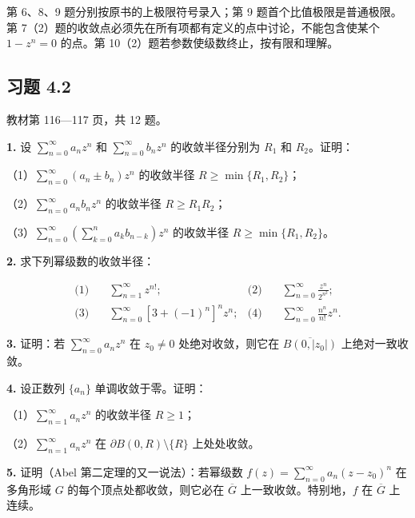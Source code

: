 \documentclass[11pt,a4paper]{article}
\begin{document}
第 6、8、9 题分别按原书的上极限符号录入；第 9
题首个比值极限是普通极限。第
7（2）题的收敛点必须先在所有项都有定义的点中讨论，不能包含使某个
\(1-z^n=0\) 的点。第 10（2）题若参数使级数终止，按有限和理解。

\subsection{习题 4.2}\label{ch04-practice-heading-2}

教材第 116---117 页，共 12 题。

\par{}
\noindent\textbf{1.} 设 \(\sum_{n=0}^{\infty}a_nz^n\) 和
\(\sum_{n=0}^{\infty}b_nz^n\) 的收敛半径分别为 \(R_1\) 和
\(R_2\)。证明：

（1）\(\sum_{n=0}^{\infty}(a_n\pm b_n)z^n\) 的收敛半径
\(R\ge\min\{R_1,R_2\}\)；

（2）\(\sum_{n=0}^{\infty}a_nb_nz^n\) 的收敛半径 \(R\ge R_1R_2\)；

（3）\(\sum_{n=0}^{\infty}(\sum_{k=0}^na_kb_{n-k})z^n\) 的收敛半径
\(R\ge\min\{R_1,R_2\}\)。

\par{}
\noindent\textbf{2.} 求下列幂级数的收敛半径：

\[
\begin{aligned}
\text{(1)}&\quad\sum_{n=1}^{\infty}z^{n!};
&\text{(2)}&\quad\sum_{n=0}^{\infty}\frac{z^n}{2^{n^2}};\\
\text{(3)}&\quad\sum_{n=0}^{\infty}[3+(-1)^n]^nz^n;
&\text{(4)}&\quad\sum_{n=0}^{\infty}\frac{n^n}{n!}z^n.
\end{aligned}
\]

\par{}
\noindent\textbf{3.} 证明：若 \(\sum_{n=0}^{\infty}a_nz^n\) 在 \(z_0\ne0\)
处绝对收敛，则它在 \(\overline{B(0,|z_0|)}\) 上绝对一致收敛。

\par{}
\noindent\textbf{4.} 设正数列 \(\{a_n\}\) 单调收敛于零。证明：

（1）\(\sum_{n=1}^{\infty}a_nz^n\) 的收敛半径 \(R\ge1\)；

（2）\(\sum_{n=1}^{\infty}a_nz^n\) 在 \(\partial B(0,R)\setminus\{R\}\)
上处处收敛。

\par{}
\noindent\textbf{5.} 证明（Abel 第二定理的又一说法）：若幂级数
\(f(z)=\sum_{n=0}^{\infty}a_n(z-z_0)^n\) 在多角形域 \(G\)
的每个顶点处都收敛，则它必在 \(\overline G\) 上一致收敛。特别地，\(f\)
在 \(\overline G\) 上连续。
\end{document}
